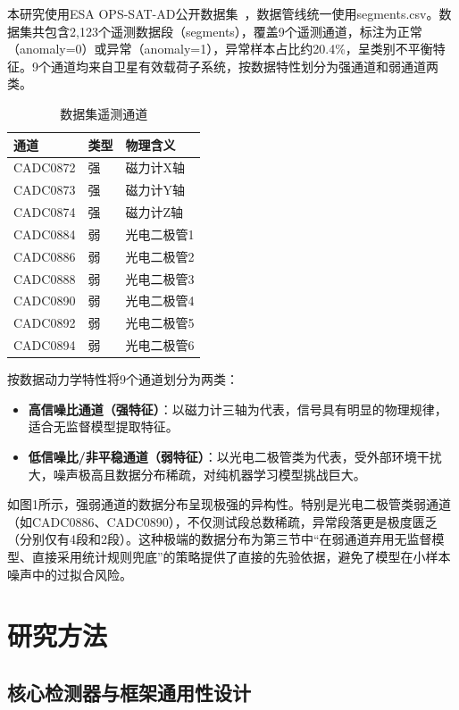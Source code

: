 \documentclass[conference]{IEEEtran}
\begin{document}
本研究使用ESA OPS-SAT-AD公开数据集~\cite{Ruszczak2025}，数据管线统一使用segments.csv。数据集共包含2,123个遥测数据段（segments），覆盖9个遥测通道，标注为正常（anomaly=0）或异常（anomaly=1），异常样本占比约20.4\%，呈类别不平衡特征。9个通道均来自卫星有效载荷子系统，按数据特性划分为强通道和弱通道两类。

\begin{table}[htbp]
\centering
\caption{数据集遥测通道}
\label{tab:channels}
\begin{tabular}{lll}
\toprule
通道 & 类型 & 物理含义 \\
\midrule
CADC0872 & 强 & 磁力计X轴 \\
CADC0873 & 强 & 磁力计Y轴 \\
CADC0874 & 强 & 磁力计Z轴 \\
CADC0884 & 弱 & 光电二极管1 \\
CADC0886 & 弱 & 光电二极管2 \\
CADC0888 & 弱 & 光电二极管3 \\
CADC0890 & 弱 & 光电二极管4 \\
CADC0892 & 弱 & 光电二极管5 \\
CADC0894 & 弱 & 光电二极管6 \\
\bottomrule
\end{tabular}
\end{table}

按数据动力学特性将9个通道划分为两类：

\begin{itemize}
    \item \textbf{高信噪比通道（强特征）}：以磁力计三轴为代表，信号具有明显的物理规律，适合无监督模型提取特征。
    \item \textbf{低信噪比/非平稳通道（弱特征）}：以光电二极管类为代表，受外部环境干扰大，噪声极高且数据分布稀疏，对纯机器学习模型挑战巨大。
\end{itemize}

如图1所示，强弱通道的数据分布呈现极强的异构性。特别是光电二极管类弱通道（如CADC0886、CADC0890），不仅测试段总数稀疏，异常段落更是极度匮乏（分别仅有4段和2段）。这种极端的数据分布为第三节中``在弱通道弃用无监督模型、直接采用统计规则兜底''的策略提供了直接的先验依据，避免了模型在小样本噪声中的过拟合风险。

\section{研究方法}

\subsection{核心检测器与框架通用性设计}
\end{document}
